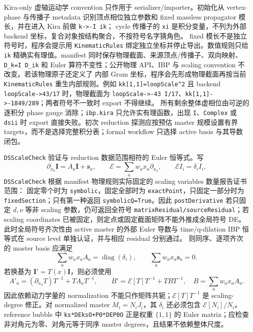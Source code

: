﻿\documentclass[a4paper,11pt]{article}
\begin{document}
Kira-only 虚轴运动学 convention 只作用于 serializer/importer。初始化从 vertex-phase 与传播子 metadata
识别顶点相位独立参数和 fixed massless propagator 模长，并在进入 Kira 前做 \texttt{k->-I ik}；
cycle 传播子的 \texttt{xi} 是积分变量，不列为外部 backend 坐标，复合对象按结构聚合，不按符号名字猜角色。
fixed 模长不是独立符号时，程序会提示用 \texttt{KinematicRules} 绑定独立坐标并停止导出。数值规则只给
\texttt{ik} 精确实有理值。manifest 同时保存物理截面、来源顶点/传播子、双向映射、\texttt{D\_k=I D\_ik}
和 Euler 算符不变性；公开物理 API、IBP 与 scaling convention 不改变。若该物理原子还定义了
内部 Gram 坐标，程序会先形成物理截面再按当前 \texttt{KinematicRules} 重生内部规则。例如
\texttt{kk[1,1]=loopScale\^{}2} 且 backend \texttt{loopScale->43/17} 时，物理截面为
\texttt{loopScale->-43 I/17}、\texttt{kk[1,1]->-1849/289}；两者符号不一致时 export 不得继续。
所有剩余整体虚相位由可逆的逐积分 phase gauge 消除；\texttt{ibp.kira} 只允许实有理函数，出现
\texttt{I}、\texttt{Complex} 或 \texttt{dsii} 时 export 直接失败。初次 reduction 探测应按预估 master
规模设置有界 targets，而不是选择完整积分表；formal workflow 只选择 active basis 与其导数闭包。

\texttt{DSScaleCheck} 验证与 reduction 数据范围相符的 Euler 恒等式。写
\begin{equation}
 \partial_{x_a}\boldsymbol I=A_a\boldsymbol I+\boldsymbol s_a,
 \qquad \mathcal E=\sum_a w_a x_a\partial_{x_a},
 \qquad \mathcal E I_i=\delta_i I_i,
\end{equation}
\texttt{DSScaleCheck} 根据 manifest 物理规则实际固定的 scaling variables 数量报告证书范围：
固定零个时为 \texttt{symbolic}，固定全部时为 \texttt{exactPoint}，只固定一部分时为
\texttt{fixedSection}；只有第一种返回 \texttt{symbolicQ=True}。因此 \texttt{postDerivative} 若只固定
$d,\nu$ 等非 scaling 参数，仍可返回全符号 \texttt{matrixResidual/sourceResidual}；若 scaling
coordinates 已被固定，则定点或固定截面矩阵不能外推成全局符号 DE。此时全局符号齐次性由 active
master 的外部 Euler 导数与 time/q-dilation IBP 恒等式在 source level 单独认证，并与相应 residual
分别通过。
则同序、逐项齐次的 master basis 应满足
\begin{equation}
 \sum_a w_a x_a A_a=\operatorname{diag}(\delta_i),
 \qquad \sum_a w_a x_a\boldsymbol s_a=0.
\end{equation}
若换基为 $\boldsymbol I'=T(x)\boldsymbol I$，则必须使用
\begin{equation}
 A'_a=(\partial_{x_a}T)T^{-1}+T A_aT^{-1},\qquad
 B'=\mathcal E[T]T^{-1}+TBT^{-1},
 \quad B=\sum_a w_a x_aA_a.
\end{equation}
因此依赖动力学量的 normalization 不能只作矩阵共轭；$\mathcal E[T]T^{-1}$ 是 scaling-degree
修正。对 normalized master $M_i=N_iJ_i$，其 $\delta_i$ 还必须包含
$\mathcal E[N_i]/N_i$。reference bubble 中 \texttt{ks*DEksO+P0*DEP0O} 正是权重
$\{1,1\}$ 的 Euler matrix；应检查非对角元为零、对角元等于同序 master degrees，且结果不依赖整体尺度。
\end{document}
